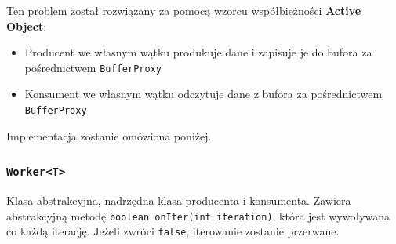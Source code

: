 \documentclass[11pt]{article}
\providecommand{\tightlist}{%
      \setlength{\itemsep}{0pt}\setlength{\parskip}{0pt}}
\begin{document}
Ten problem został rozwiązany za pomocą wzorcu współbieżności
\textbf{Active Object}:

\begin{itemize}
\tightlist
\item
  Producent we własnym wątku produkuje dane i zapisuje je do bufora za
  pośrednictwem \texttt{BufferProxy}
\item
  Konsument we własnym wątku odczytuje dane z bufora za pośrednictwem
  \texttt{BufferProxy}
\end{itemize}

Implementacja zostanie omówiona poniżej.

    \hypertarget{workert}{%
\subsubsection{\texorpdfstring{\texttt{Worker\textless{}T\textgreater{}}}{Worker\textless T\textgreater{}}}\label{workert}}

Klasa abstrakcyjna, nadrzędna klasa producenta i konsumenta. Zawiera
abstrakcyjną metodę \texttt{boolean\ onIter(int\ iteration)}, która jest
wywoływana co każdą iterację. Jeżeli zwróci \texttt{false}, iterowanie
zostanie przerwane.
\end{document}
